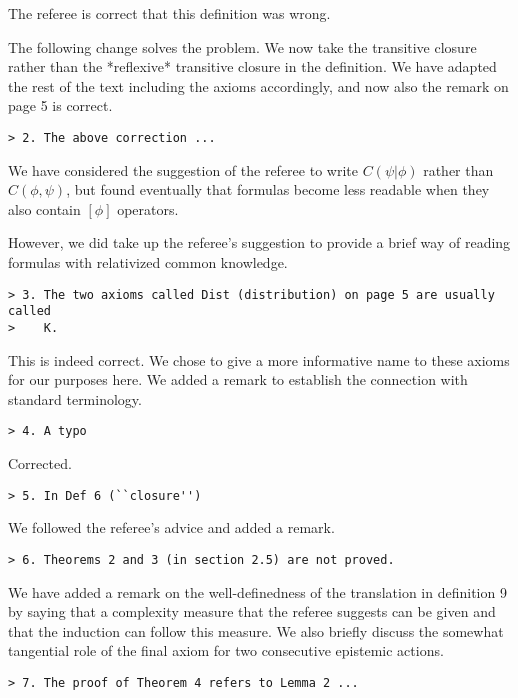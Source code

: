 \documentclass{article}
\begin{document}
The referee is correct that this definition was wrong.

The following change solves the problem. We now take the transitive
closure rather than the *reflexive* transitive closure in the
definition. We have adapted the rest of the text including the
axioms accordingly, and now also the remark on page 5 is correct.

\begin{verbatim}
> 2. The above correction ...
\end{verbatim}

We have considered the suggestion of the referee to write $C(\psi|\phi)$
rather than $C(\phi,\psi)$, but found eventually that formulas become
less readable when they also contain $[\phi]$ operators.

However, we did take up the referee's suggestion to provide a
brief way of reading formulas with relativized common knowledge.

\begin{verbatim}
> 3. The two axioms called Dist (distribution) on page 5 are usually called
>    K.
\end{verbatim} 

This is indeed correct. We chose to give a more informative name
to these axioms for our purposes here. We added a remark to establish
the connection with standard terminology.

\begin{verbatim}
> 4. A typo
\end{verbatim}

Corrected.

\begin{verbatim}
> 5. In Def 6 (``closure'')
\end{verbatim}

We followed the referee's advice and added a remark.

\begin{verbatim}
> 6. Theorems 2 and 3 (in section 2.5) are not proved.
\end{verbatim}

We have added a remark on the well-definedness of the translation in
definition 9 by saying that a complexity measure that the referee
suggests can be given and that the induction can follow this measure.
We also briefly discuss the somewhat tangential role of the final
axiom for two consecutive epistemic actions.

\begin{verbatim}
> 7. The proof of Theorem 4 refers to Lemma 2 ...
\end{verbatim}
\end{document}
